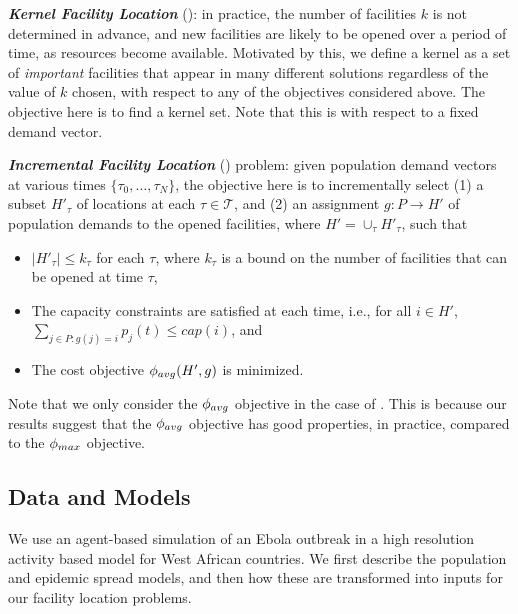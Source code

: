\noindent
\textbf{\emph{Kernel Facility Location}} (\probkernel):
in practice, the number of facilities $k$ is not determined in advance, and new facilities are likely to be
opened over a period of time, as resources become available. Motivated by this, we define a
kernel as a set of \textit{important} facilities that appear in many different solutions regardless of the value of $k$ chosen,
with respect to any of the objectives considered above. The objective here is to find a kernel set.
Note that this is with respect to a fixed demand vector.


\noindent
\textbf{\emph{Incremental Facility Location}} (\probinc) problem: given population demand vectors at various times
$\{\tau_0,\ldots,\tau_N\}$, the objective here is to
incrementally select (1) a subset $H'_{\tau}$ of locations at each $\tau\in\mathcal{T}$,
and (2) an assignment $g:P\rightarrow H'$
of population demands to the opened facilities, where $H'=\cup_{\tau} H'_{\tau}$, such that
\begin{itemize}
\item $|H'_{\tau}|\leq k_{\tau}$ for each $\tau$, where $k_{\tau}$ is a bound on the number 
of facilities that can be opened at time $\tau$,
\item 
The capacity constraints are satisfied at each time, i.e., 
for all $i\in H'$, $\sum_{j \in P: g(j)=i} p_j(t) \leq cap(i)$, and
\item The cost objective $\phi_{avg}(H', g)$ is minimized. 
\end{itemize}

Note that we only consider the $\phi_{avg}$ objective in the case of \probinc{}. This is because
our results suggest that the $\phi_{avg}$ objective has good properties, in practice, compared to the
$\phi_{max}$ objective.


\subsection*{Data and Models}
We use an agent-based simulation of an Ebola outbreak in a high resolution activity based model for 
West African countries.
We first describe the population and epidemic spread models, and then how these are transformed into
inputs for our facility location problems.

